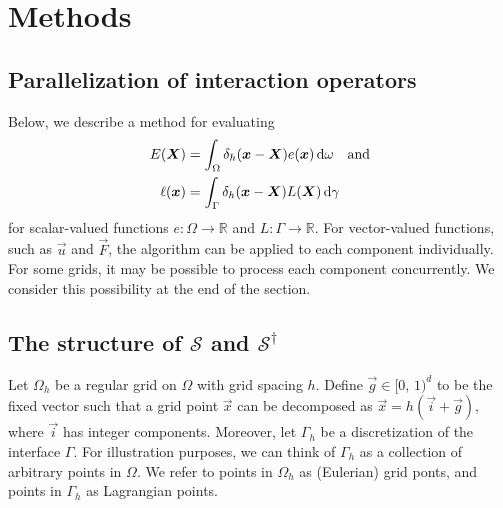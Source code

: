 \section{Methods}





\subsection{Parallelization of interaction operators}

Below, we describe a method for evaluating
\begin{align}
    \label{eq:scalar-interp}
    E(\vec{X}) &= \int_\Omega \delta_h(\vec{x}-\vec{X})e(\vec{x}) \d\omega \quad \text{and}\\
    \label{eq:scalar-spread}
    \ell(\vec{x}) &= \int_\Gamma \delta_h(\vec{x}-\vec{X})L(\vec{X}) \d\gamma
\end{align}
for scalar-valued functions $e: \Omega\to\mathbb{R}$ and $L:\Gamma\to\mathbb{R}$.
For vector-valued functions, such as $\vec{u}$ and $\vec{F}$, the algorithm
can be applied to each component individually. For some grids, it may be
possible to process each component concurrently. We consider this possibility
at the end of the section.

\subsection{The structure of $\mathcal{S}$ and $\mathcal{S}^\dagger$}

Let $\Omega_h$ be a regular grid on $\Omega$ with grid spacing $h$. Define
$\vec{g} \in [0,\,1)^d$ to be the fixed vector such that a grid point $\vec{x}$
can be decomposed as $\vec{x}=h(\vec{i}+\vec{g})$, where $\vec{i}$ has integer
components. Moreover, let $\Gamma_h$ be a discretization of the interface
$\Gamma$. For illustration purposes, we can think of $\Gamma_h$ as a collection
of arbitrary points in $\Omega$. We refer to points in $\Omega_h$ as (Eulerian)
grid ponts, and points in $\Gamma_h$ as Lagrangian points.

